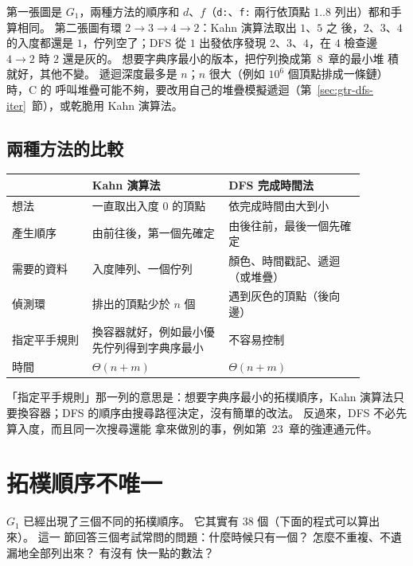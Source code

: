 第一張圖是 $G_1$，兩種方法的順序和 $d$、$f$（\texttt{d:}、\texttt{f:} 兩行依頂點
$1..8$ 列出）都和手算相同。 第二張圖有環 $2 \to 3 \to 4 \to 2$：Kahn 演算法取出 $1$、$5$ 之
後，$2$、$3$、$4$ 的入度都還是 $1$，佇列空了；DFS 從 $1$ 出發依序發現 $2$、$3$、$4$，在
$4$ 檢查邊 $4 \to 2$ 時 $2$ 還是灰的。 想要字典序最小的版本，把佇列換成第~8~章的最小堆
積就好，其他不變。 遞迴深度最多是 $n$；$n$ 很大（例如 $10^6$ 個頂點排成一條鏈）時，C 的
呼叫堆疊可能不夠，要改用自己的堆疊模擬遞迴（第~\ref{sec:gtr-dfs-iter}~節），或乾脆用 Kahn 演算法。

\subsection{兩種方法的比較}

\begin{center}
\begin{tabular}{>{\raggedright\arraybackslash}p{0.2\linewidth}>{\raggedright\arraybackslash}p{0.34\linewidth}>{\raggedright\arraybackslash}p{0.34\linewidth}}
\toprule
 & Kahn 演算法 & DFS 完成時間法 \\
\midrule
想法 & 一直取出入度 $0$ 的頂點 & 依完成時間由大到小 \\
產生順序 & 由前往後，第一個先確定 & 由後往前，最後一個先確定 \\
需要的資料 & 入度陣列、一個佇列 & 顏色、時間戳記、遞迴（或堆疊） \\
偵測環 & 排出的頂點少於 $n$ 個 & 遇到灰色的頂點（後向邊） \\
指定平手規則 & 換容器就好，例如最小優先佇列得到字典序最小 & 不容易控制 \\
時間 & $\Theta(n + m)$ & $\Theta(n + m)$ \\
\bottomrule
\end{tabular}
\end{center}

「指定平手規則」那一列的意思是：想要字典序最小的拓樸順序，Kahn 演算法只要換容器；DFS
的順序由搜尋路徑決定，沒有簡單的改法。 反過來，DFS 不必先算入度，而且同一次搜尋還能
拿來做別的事，例如第~23~章的強連通元件。

\section{拓樸順序不唯一}
\label{sec:tps-count}

$G_1$ 已經出現了三個不同的拓樸順序。 它其實有 $38$ 個（下面的程式可以算出來）。 這一
節回答三個考試常問的問題：什麼時候只有一個？ 怎麼不重複、不遺漏地全部列出來？ 有沒有
快一點的數法？

